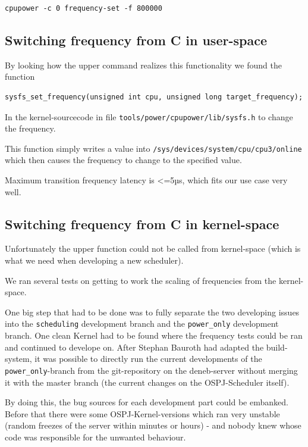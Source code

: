 \documentclass[]{report}
\begin{document}
\begin{lstlisting}[style=simple]
cpupower -c 0 frequency-set -f 800000
\end{lstlisting}

\subsection{Switching frequency from C in
user-space}\label{switching-frequency-from-c-in-user-space}

By looking how the upper command realizes this functionality we found
the function

\begin{lstlisting}[style=simple]
sysfs_set_frequency(unsigned int cpu, unsigned long target_frequency);
\end{lstlisting}

In the kernel-sourcecode in file
\lstinline!tools/power/cpupower/lib/sysfs.h! to change the frequency.

This function simply writes a value into
\lstinline!/sys/devices/system/cpu/cpu3/online! which then causes the
frequency to change to the specified value.

Maximum transition frequency latency is \textless{}=5µs, which fits our
use case very well.

\subsection{Switching frequency from C in
kernel-space}\label{switching-frequency-from-c-in-kernel-space}

Unfortunately the upper function could not be called from kernel-space
(which is what we need when developing a new scheduler).

We ran several tests on getting to work the scaling of frequencies from
the kernel-space.

One big step that had to be done was to fully separate the two
developing issues into the \lstinline!scheduling! development branch and
the \lstinline!power_only! development branch. One clean Kernel had to
be found where the frequency tests could be ran and continued to
develope on. After Stephan Bauroth had adapted the build-system, it was
possible to directly run the current developments of the
\lstinline!power_only!-branch from the git-repository on the
deneb-server without merging it with the master branch (the current
changes on the OSPJ-Scheduler itself).

By doing this, the bug sources for each development part could be
embanked. Before that there were some OSPJ-Kernel-versions which ran
very unstable (random freezes of the server within minutes or hours) -
and nobody knew whose code was responsible for the unwanted behaviour.
\end{document}
